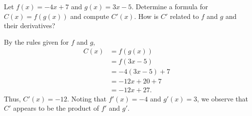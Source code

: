 \begin{example} \label{Ex:2.6.Eg1}
Let $f(x) = -4x + 7$ and $g(x) = 3x - 5$.  Determine a formula for $C(x) = f(g(x))$ and compute $C'(x)$.  How is $C'$ related to $f$ and $g$ and their derivatives?

\solution By the rules given for $f$ and $g$, 
\begin{align*}
C(x) & =  f(g(x)) \\
& =  f(3x-5) \\
& =  -4(3x-5) + 7 \\
& =  -12x + 20 + 7 \\
& =  -12x + 27.
\end{align*}
Thus, $C'(x) = -12$.  Noting that $f'(x) = -4$ and $g'(x) = 3$, we observe that $C'$ appears to be the product of $f'$ and $g'$.
\end{example}